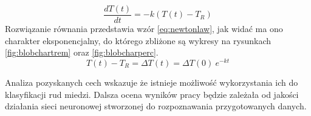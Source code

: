 \begin{equation}
	\frac{dT \left( t \right)}{dt}=-k\left( T \left( t \right) -T_{R} \right)
\label{eq:newtonlawdiff}
\end{equation}
Rozwiązanie równania przedstawia wzór \ref{eq:newtonlaw}, jak widać ma ono
charakter eksponencjalny, do którego zbliżone są wykresy na rysunkach
\ref{fig:blobchartrem} oraz \ref{fig:blobcharperc}.
\begin{equation}
	T(t) - T_{R} = \Delta T (t) = \Delta T (0) \ e^ {-k t}
\label{eq:newtonlaw}
\end{equation}

Analiza pozyskanych cech wskazuje że istnieje możliwość wykorzystania ich
do klasyfikacji rud miedzi.
Dalsza ocena wyników pracy będzie zależała od jakości działania sieci
neuronowej stworzonej do rozpoznawania przygotowanych danych.








